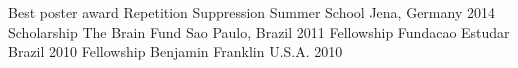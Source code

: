 \begin{cvhonors}
  \cvhonor
    {Best poster award}
    {Repetition Suppression Summer School}
    {Jena, Germany}
    {2014}
  \cvhonor
    {Scholarship}
    {The Brain Fund}
    {Sao Paulo, Brazil}
    {2011}
  \cvhonor
    {Fellowship}
    {Fundacao Estudar}
    {Brazil}
    {2010}
  \cvhonor
    {Fellowship}
    {Benjamin Franklin}
    {U.S.A.}
    {2010}
\end{cvhonors}